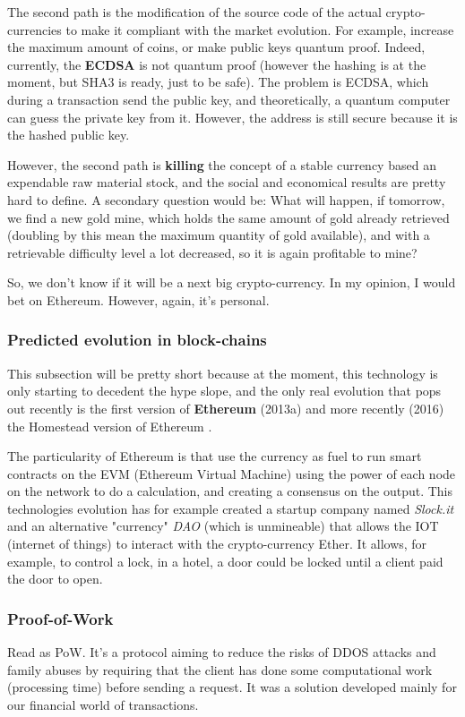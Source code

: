 The second path is the modification of the source code of the actual crypto-currencies to make it compliant with the market evolution. For example, increase the maximum amount of coins, or make public keys quantum proof. Indeed, currently, the \textbf{ECDSA} is not quantum proof (however the hashing is at the moment, but SHA3 is ready, just to be safe). The problem is ECDSA, which during a transaction send the public key, and theoretically, a quantum computer can guess the private key from it. However, the address is still secure because it is the hashed public key.

However, the second path is \textbf{killing} the concept of a stable currency based an expendable raw material stock, and the social and economical results are pretty hard to define. A secondary question would be: What will happen, if tomorrow, we find a new gold mine, which holds the same amount of gold already retrieved (doubling by this mean the maximum quantity of gold available), and with a retrievable difficulty level a lot decreased, so it is again profitable to mine?

So, we don't know if it will be a next big crypto-currency. In my opinion, I would bet on Ethereum. However, again, it's personal.

\subsubsection{Predicted evolution in block-chains}
This subsection will be pretty short because at the moment, this technology is only starting to decedent the hype slope, and the only real evolution that pops out recently is the first version of  \textbf{Ethereum}\cite{VitalikButerin2013APlatform} (2013a) and more recently (2016) the Homestead version of Ethereum \cite{DR.GAVINWOOD2015ETHEREUM:DRAFT}.

The particularity of Ethereum is that use the currency as fuel to run smart contracts on the EVM (Ethereum Virtual Machine) using the power of each node on the network to do a calculation, and creating a consensus on the output. This technologies evolution has for example created a startup company named \textit{Slock.it} and an alternative "currency" \textit{DAO} (which is unmineable) that allows the IOT (internet of things) to interact with the crypto-currency Ether. It allows, for example, to control a lock, in a hotel, a door could be locked until a client paid the door to open.

\subsubsection{Proof-of-Work}
Read as PoW\cite{Dwork1993PricingMail, Jakobsson1999ProofsAbstract}. It's a protocol aiming to reduce the risks of DDOS attacks and family abuses by requiring that the client has done some computational work (processing time) before sending a request. It was a solution developed mainly for our financial world of transactions.

